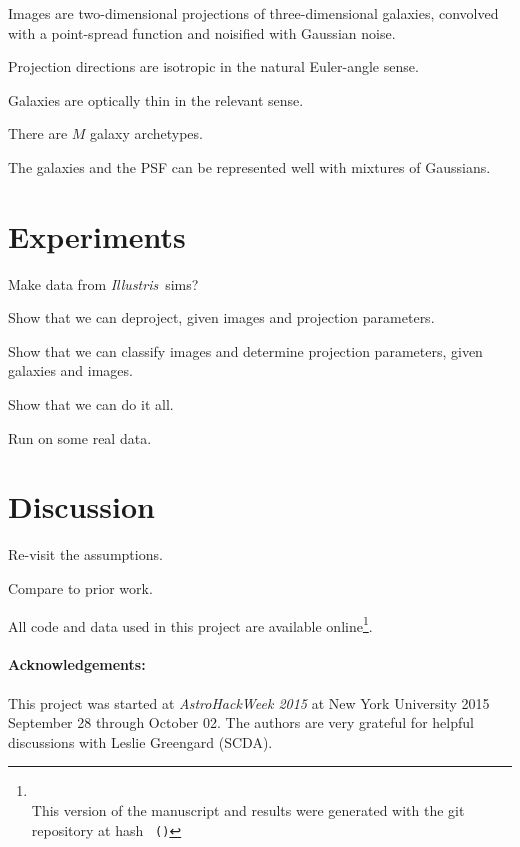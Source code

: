 \documentclass[12pt]{article}
\newcommand{\project}[1]{\textsl{#1}}
\newcommand{\illustris}{\project{Illustris}}
\begin{document}
Images are two-dimensional projections of three-dimensional galaxies,
convolved with a point-spread function and noisified with Gaussian
noise.

Projection directions are isotropic in the natural Euler-angle sense.

Galaxies are optically thin in the relevant sense.

There are $M$ galaxy archetypes.

The galaxies and the PSF can be represented well with mixtures of
Gaussians.

\section{Experiments}

Make data from \illustris\ sims?

Show that we can deproject, given images and projection parameters.

Show that we can classify images and determine projection parameters,
given galaxies and images.

Show that we can do it all.

Run on some real data.

\section{Discussion}

Re-visit the assumptions.

Compare to prior work.

All code and data used in this project are available
online\footnote{\giturl\\This version of the manuscript and results
  were generated with the git repository at hash
  \texttt{\githash~(\gitdate)}}.

\paragraph{Acknowledgements:}
This project was started at \project{AstroHackWeek 2015} at New York
University 2015 September 28 through October 02.
The authors are very grateful for helpful discussions with Leslie
Greengard (SCDA).
\end{document}
